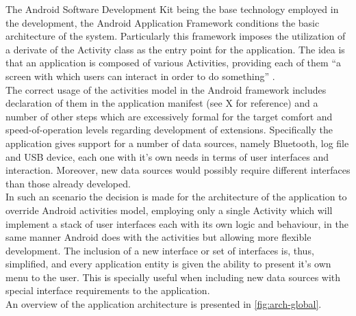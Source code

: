 		The Android Software Development Kit being the base technology employed in the development, the Android Application Framework conditions the basic architecture of the system. Particularly this framework imposes the utilization of a derivate of the Activity class as the entry point for the application. The idea is that an application is composed of various Activities, providing each of them ``a screen with which users can interact in order to do something'' .\\

		The correct usage of the activities model in the Android framework includes declaration of them in the application manifest (see X  for reference) and a number of other steps which are excessively formal for the target comfort and speed-of-operation levels regarding development of extensions. Specifically the application gives support for a number of data sources, namely Bluetooth, log file and USB device, each one with it's own needs in terms of user interfaces and interaction. Moreover, new data sources would possibly require different interfaces than those already developed.\\

		In such an scenario the decision is made for the architecture of the application to override Android activities model, employing only a single Activity which will implement a stack of user interfaces each with its own logic and behaviour, in the same manner Android does with the activities but allowing more flexible development. The inclusion of a new interface or set of interfaces is, thus, simplified, and every application entity is given the ability to present it's own menu to the user. This is specially useful when including new data sources with special interface requirements to the application.\\

		An overview of the application architecture is presented in \autoref{fig:arch-global}.


